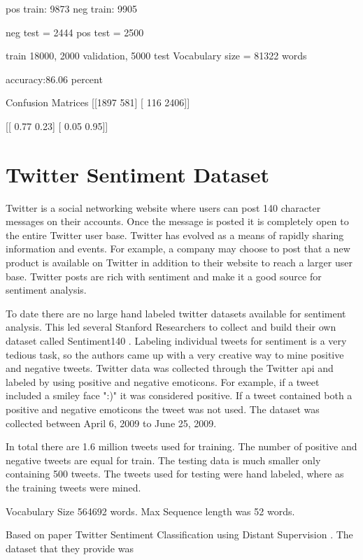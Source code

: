 \documentclass[12pt]{article}
\begin{document}
pos train: 9873
neg train: 9905

neg test = 2444
pos test = 2500

train 18000, 2000 validation, 5000 test
Vocabulary size = 81322 words

accuracy:86.06 percent

Confusion Matrices
[[1897  581]
[ 116 2406]]

[[ 0.77  0.23]
[ 0.05  0.95]]





\section{Twitter Sentiment Dataset}

Twitter is a social networking website \cite{twitter} where users can post 140 character messages on their accounts. Once the message is posted it is completely open to the entire Twitter user base. Twitter has evolved as a means of rapidly sharing information and events. For example, a company may choose to post that a new product is available on Twitter in addition to their website to reach a larger user base. Twitter posts are rich with sentiment and make it a good source for sentiment analysis.

To date there are no large hand labeled twitter datasets available for sentiment analysis. This led several Stanford Researchers \cite{Go_Bhayani_Huang_2009} to collect and build their own dataset called Sentiment140 \cite{sentiment140}. Labeling individual tweets for sentiment is a very tedious task, so the authors came up with a very creative way to mine positive and negative tweets. Twitter data was collected through the Twitter \ac{api} and labeled by using positive and negative emoticons. For example, if a tweet included a smiley face ":)" it was considered positive. If a tweet contained both a positive and negative emoticons the tweet was not used. The dataset was collected between April 6, 2009 to June 25, 2009.

In total there are 1.6 million tweets used for training. The number of positive and negative tweets are equal for train. The testing data is much smaller only containing 500 tweets. The tweets used for testing were hand labeled, where as the training tweets were mined.

Vocabulary Size 564692 words.
Max Sequence length was 52 words.

Based on paper Twitter Sentiment Classification using Distant Supervision \cite{Go_Bhayani_Huang_2009}. The dataset that they provide was
\end{document}
